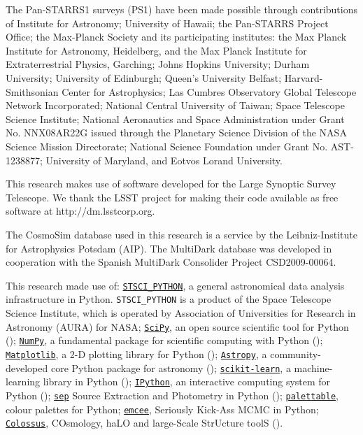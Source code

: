 \documentclass[a4paper,fleqn,usenatbib]{mnras}
\begin{document}
  The Pan-STARRS1 surveys (PS1) have been made possible through contributions of  
  Institute for Astronomy; University of Hawaii; the Pan-STARRS Project Office; 
  the Max-Planck Society and its participating institutes: the Max Planck Institute 
  for Astronomy, Heidelberg, and the Max Planck Institute for Extraterrestrial Physics, 
  Garching; Johns Hopkins University; Durham University; University of Edinburgh; 
  Queen's University Belfast; Harvard-Smithsonian Center for Astrophysics; Las 
  Cumbres Observatory Global Telescope Network Incorporated; National Central 
  University of Taiwan; Space Telescope Science Institute; National Aeronautics 
  and Space Administration under Grant No. NNX08AR22G issued through the Planetary 
  Science Division of the NASA Science Mission Directorate; National Science 
  Foundation under Grant No. AST-1238877; University of Maryland, and Eotvos 
  Lorand University. 
  
  This research makes use of software developed for the Large Synoptic Survey 
  Telescope. We thank the LSST project for making their code available as free 
  software at http://dm.lsstcorp.org.
  
  The CosmoSim database used in this research is a service by the Leibniz-Institute for 
  Astrophysics Potsdam (AIP).
  The MultiDark database was developed in cooperation with the Spanish MultiDark 
  Consolider Project CSD2009-00064.
  
  This research made use of:
  \href{http://www.stsci.edu/institute/software_hardware/pyraf/stsci\_python}{\texttt{STSCI\_PYTHON}},
      a general astronomical data analysis infrastructure in Python. 
      \texttt{STSCI\_PYTHON} is a product of the Space Telescope Science Institute, 
      which is operated by Association of Universities for Research 
      in Astronomy (AURA) for NASA;
  \href{http://www.scipy.org/}{\texttt{SciPy}},
      an open source scientific tool for Python (\citealt{SciPy});
  \href{http://www.numpy.org/}{\texttt{NumPy}}, 
      a fundamental package for scientific computing with Python (\citealt{NumPy});
  \href{http://matplotlib.org/}{\texttt{Matplotlib}}, 
      a 2-D plotting library for Python (\citealt{Matplotlib});
  \href{http://www.astropy.org/}{\texttt{Astropy}}, a community-developed 
      core Python package for astronomy (\citealt{AstroPy}); 
  \href{http://scikit-learn.org/stable/index.html}{\texttt{scikit-learn}},
      a machine-learning library in Python (\citealt{scikit-learn}); 
  \href{https://ipython.org}{\texttt{IPython}}, 
      an interactive computing system for Python (\citealt{IPython});
  \href{https://github.com/kbarbary/sep}{\texttt{sep}} 
      Source Extraction and Photometry in Python (\citealt{PythonSEP});
  \href{https://jiffyclub.github.io/palettable/}{\texttt{palettable}},
      colour palettes for Python;
  \href{http://dan.iel.fm/emcee/current/}{\texttt{emcee}}, 
      Seriously Kick-Ass MCMC in Python;
  \href{http://bdiemer.bitbucket.org/}{\texttt{Colossus}}, 
      COsmology, haLO and large-Scale StrUcture toolS (\citealt{Colossus}).
\end{document}
